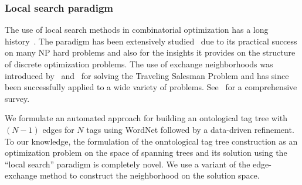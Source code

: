 {\subsubsection{Local search paradigm}

The use of local search methods in combinatorial optimization has a long history~\cite{localBook}. 
The paradigm has been extensively studied~\cite{johnson}\cite{aarts} due to its practical success on many NP hard problems and also for the insights it provides on the structure of discrete optimization problems.
The use of exchange neighborhoods was introduced by~\cite{croes} and~\cite{lin} for solving the Traveling Salesman Problem and has since been successfully applied to a wide variety of problems. See~\cite{localBook} for a comprehensive survey. 




\indent We formulate an automated approach for building an ontological tag tree with $(N-1)$ edges for $N$ tags using WordNet followed by a data-driven refinement.  
To our knowledge, the formulation of the onntological tag tree construction as an optimization problem on the space of spanning trees and its solution using the ``local search'' paradigm is completely novel. We use a variant of the edge-exchange  method to construct the neighborhood on the solution space. 















}
